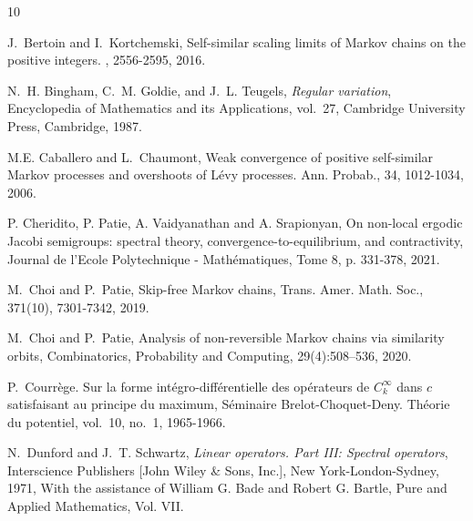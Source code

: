 \documentclass[12pt]{amsart}
\numberwithin{equation}{section}
\theoremstyle{definition}
\theoremstyle{assump}
\theoremstyle{remark}
\begin{document}
{\begin{thebibliography}{10}

J.~Bertoin and I.~Kortchemski,
\newblock Self-similar scaling limits of {Markov} chains on the positive
  integers.
, 2556-2595, 2016.

N.~H. Bingham, C.~M. Goldie, and J.~L. Teugels, \emph{Regular variation},
  Encyclopedia of Mathematics and its Applications, vol.~27, Cambridge
  University Press, Cambridge, 1987.

M.E. Caballero and L.~Chaumont,
\newblock Weak convergence of positive self-similar {M}arkov processes and
  overshoots of {L}\'evy processes. Ann. Probab., 34, 1012-1034, 2006.



P. Cheridito, P. Patie, A. Vaidyanathan and A. Srapionyan,  On non-local ergodic Jacobi semigroups: spectral theory, convergence-to-equilibrium, and contractivity,   {Journal de l'Ecole Polytechnique - Math\'ematiques}, Tome 8, p. 331-378, 2021.

M.~Choi and P.~Patie,
  {Skip-free
  Markov chains},
 Trans. Amer. Math. Soc., 371(10), 7301-7342, 2019.

M.~Choi and P.~Patie,
Analysis of non-reversible Markov chains via similarity orbits, Combinatorics, Probability and Computing, 29(4):508--536, 2020.

P.~Courr\`ege.  Sur la forme int\'egro-diff\'erentielle des op\'erateurs de
  $C^\infty_k$ dans $c$ satisfaisant au principe du maximum,  {
  S\'eminaire Brelot-Choquet-Deny. Th\'eorie du potentiel}, vol.~10, no.~1,
  1965-1966.



N.~Dunford and J.~T. Schwartz, \emph{Linear operators. {P}art {III}: {S}pectral
  operators}, Interscience Publishers [John Wiley \& Sons, Inc.], New
  York-London-Sydney, 1971, With the assistance of William G. Bade and Robert
  G. Bartle, Pure and Applied Mathematics, Vol. VII.


\end{thebibliography}}
\end{document}
